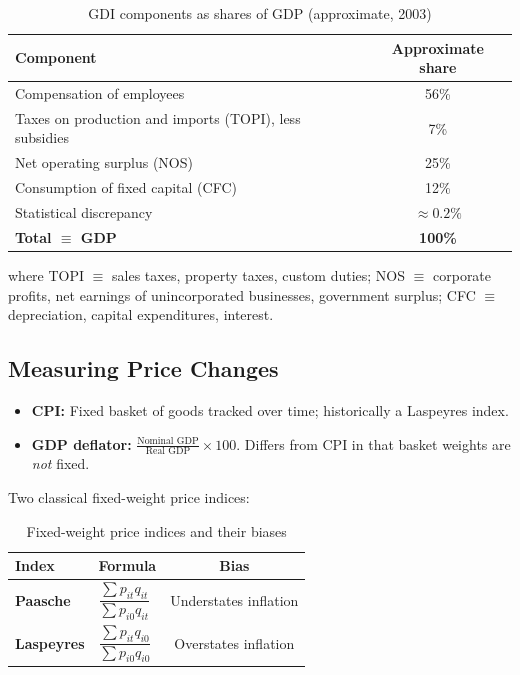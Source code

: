 \begin{table}[htp]
\centering
\caption{GDI components as shares of GDP (approximate, 2003)}
\label{tbl_GDI}
\renewcommand{\arraystretch}{1.3}
\begin{tabular}{@{}lc@{}}
\toprule
Component & Approximate share \\
\midrule
Compensation of employees & 56\% \\
Taxes on production and imports (TOPI), less subsidies & 7\% \\
Net operating surplus (NOS) & 25\% \\
Consumption of fixed capital (CFC) & 12\% \\
Statistical discrepancy & $\approx 0.2\%$ \\
\midrule
\textbf{Total $\equiv$ GDP} & \textbf{100\%} \\
\bottomrule
\end{tabular}
\renewcommand{\arraystretch}{1}
\end{table}

\noindent where TOPI $\equiv$ sales taxes, property taxes, custom duties;
NOS $\equiv$ corporate profits, net earnings of unincorporated businesses,
government surplus; CFC $\equiv$ depreciation, capital expenditures, interest.

\subsection{Measuring Price Changes}

\begin{itemize}
  \item \textbf{CPI:}
    Fixed basket of goods tracked over time; historically a
    Laspeyres index.
  \item \textbf{GDP deflator:}
    $\displaystyle\frac{\text{Nominal GDP}}{\text{Real GDP}}\times100$.
    Differs from CPI in that basket weights are \emph{not} fixed.
\end{itemize}

Two classical fixed-weight price indices:

\begin{table}[htp]
\centering
\caption{Fixed-weight price indices and their biases}
\label{tbl_PriceIndices}
\renewcommand{\arraystretch}{1.6}
\begin{tabular}{@{}llc@{}}
\toprule
Index & Formula & Bias \\
\midrule
\textbf{Paasche}\index{Paasche index}
  & $\dfrac{\displaystyle\sum p_{it}q_{it}}{\displaystyle\sum p_{i0}q_{it}}$
  & Understates inflation \\[4pt]
\textbf{Laspeyres}\index{Laspeyres index}
  & $\dfrac{\displaystyle\sum p_{it}q_{i0}}{\displaystyle\sum p_{i0}q_{i0}}$
  & Overstates inflation \\
\bottomrule
\end{tabular}
\renewcommand{\arraystretch}{1}
\end{table}

